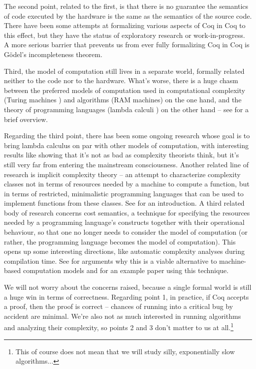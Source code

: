\documentclass[declaration,mgr,english,shortabstract]{iithesis}
\begin{document}
The second point, related to the first, is that there is no guarantee the semantics of code executed by the hardware is the same as the semantics of the source code. There have been some attempts at formalizing various aspects of Coq in Coq \cite{CoqInCoq} \cite{CoqCoqCorrect} to this effect, but they have the status of exploratory research or work-in-progress. A more serious barrier that prevents us from ever fully formalizing Coq in Coq is G\"{o}del's incompleteness theorem.

Third, the model of computation still lives in a separate world, formally related neither to the code nor to the hardware. What's worse, there is a huge chasm between the preferred models of computation used in computational complexity (Turing machines \cite{Turing}) and algorithms (RAM machines) on the one hand, and the theory of programming languages (lambda calculi \cite{Church}) on the other hand -- see \cite{OtherTuringMachine} for a brief overview.

Regarding the third point, there has been some ongoing research whose goal is to bring lambda calculus on par with other models of computation, with interesting results like \cite{ReasonableMachine} showing that it's not as bad as complexity theorists think, but it's still very far from entering the mainstream consciousness. Another related line of research is implicit complexity theory -- an attempt to characterize complexity classes not in terms of resources needed by a machine to compute a function, but in terms of restricted, minimalistic programming languages that can be used to implement functions from these classes. See \cite{ICC1} \cite{ICC2} for an introduction. A third related body of research concerns cost semantics, a technique for specifying the resources needed by a programming language's constructs together with their operational behaviour, so that one no longer needs to consider the model of computation (or rather, the programming language becomes the model of computation). This opens up some interesting directions, like automatic complexity analyses during compilation time. See \cite{CostSemanticsBlog} for arguments why this is a viable alternative to machine-based computation models and \cite{CostSemantics} for an example paper using this technique.

We will not worry about the concerns raised, because a single formal world is still a huge win in terms of correctness. Regarding point 1, in practice, if Coq accepts a proof, then the proof is correct -- chances of running into a critical bug by accident are minimal. We're also not as much interested in running algorithms and analyzing their complexity, so points 2 and 3 don't matter to us at all.\footnote{This of course does not mean that we will study silly, exponentially slow algorithms...}
\end{document}
